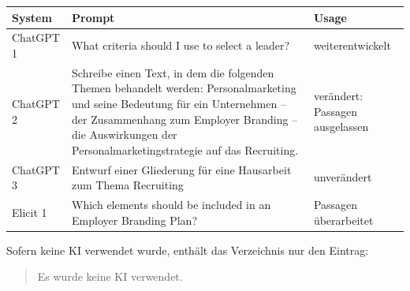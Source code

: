 %
%




\begin{table}[h]
    \renewcommand{\arraystretch}{2}
    \centering
    \begin{tabular}{p{} p{} p{}}
        \toprule
        \large System&\large Prompt&\large Usage\\
        \midrule
        ChatGPT 1 & What criteria should I use to select a leader? & weiterentwickelt \\
        ChatGPT 2 & Schreibe einen Text, in dem die folgenden Themen behandelt werden: Personalmarketing und seine Bedeutung für ein Unternehmen – der Zusammenhang zum Employer Branding – die Auswirkungen der Personalmarketingstrategie auf das Recruiting.  & verändert: Passagen ausgelassen  \\
        ChatGPT 3 & Entwurf einer Gliederung für eine Hausarbeit zum Thema Recruiting  & unverändert \\
        Elicit 1& Which elements should be included in an Employer Branding Plan?  & Passagen überarbeitet  \\
        \bottomrule
    \end{tabular}
\end{table}

Sofern keine KI verwendet wurde, enthält das Verzeichnis nur den Eintrag:
\begin{verse}
    Es wurde keine KI verwendet.
\end{verse}

